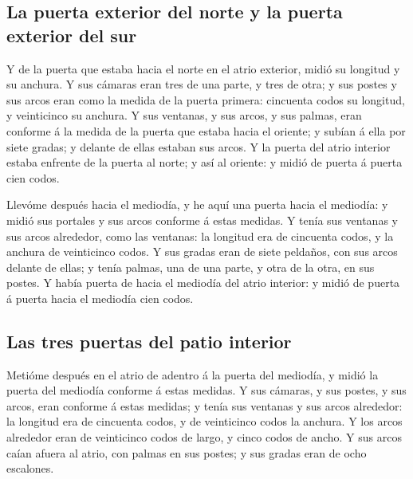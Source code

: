 \hypertarget{la-puerta-exterior-del-norte-y-la-puerta-exterior-del-sur}{%
\subsection{La puerta exterior del norte y la puerta exterior del
sur}\label{la-puerta-exterior-del-norte-y-la-puerta-exterior-del-sur}}

 Y de la puerta que estaba hacia el norte en el atrio
exterior, midió su longitud y su anchura.  Y sus cámaras
eran tres de una parte, y tres de otra; y sus postes y sus arcos eran
como la medida de la puerta primera: cincuenta codos su longitud, y
veinticinco su anchura.  Y sus ventanas, y sus arcos, y sus
palmas, eran conforme á la medida de la puerta que estaba hacia el
oriente; y subían á ella por siete gradas; y delante de ellas estaban
sus arcos.  Y la puerta del atrio interior estaba enfrente
de la puerta al norte; y así al oriente: y midió de puerta á puerta cien
codos.

 Llevóme después hacia el mediodía, y he aquí una puerta
hacia el mediodía: y midió sus portales y sus arcos conforme á estas
medidas.  Y tenía sus ventanas y sus arcos alrededor, como
las ventanas: la longitud era de cincuenta codos, y la anchura de
veinticinco codos.  Y sus gradas eran de siete peldaños,
con sus arcos delante de ellas; y tenía palmas, una de una parte, y otra
de la otra, en sus postes.  Y había puerta de hacia el
mediodía del atrio interior: y midió de puerta á puerta hacia el
mediodía cien codos.

\hypertarget{las-tres-puertas-del-patio-interior}{%
\subsection{Las tres puertas del patio
interior}\label{las-tres-puertas-del-patio-interior}}

 Metióme después en el atrio de adentro á la puerta del
mediodía, y midió la puerta del mediodía conforme á estas medidas.
 Y sus cámaras, y sus postes, y sus arcos, eran conforme á
estas medidas; y tenía sus ventanas y sus arcos alrededor: la longitud
era de cincuenta codos, y de veinticinco codos la anchura. 
Y los arcos alrededor eran de veinticinco codos de largo, y cinco codos
de ancho.  Y sus arcos caían afuera al atrio, con palmas en
sus postes; y sus gradas eran de ocho escalones.

